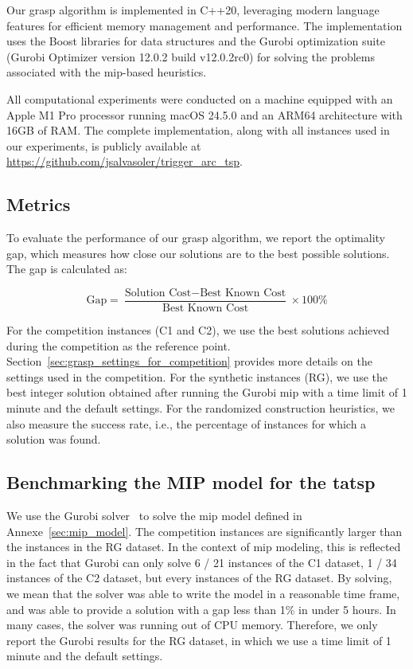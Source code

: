 \documentclass[twocolumn, switch]{article} %
\begin{document}
Our \gls{grasp} algorithm is implemented in C++20, leveraging modern language features for efficient memory management and performance.
The implementation uses the Boost libraries for data structures and the Gurobi optimization suite (Gurobi Optimizer version 12.0.2 build v12.0.2rc0) for solving the problems associated with the \gls{mip}-based heuristics.

All computational experiments were conducted on a machine equipped with an Apple M1 Pro processor running macOS 24.5.0 and an ARM64 architecture with 16GB of RAM.
The complete implementation, along with all instances used in our experiments, is publicly available at \url{https://github.com/jsalvasoler/trigger_arc_tsp}.

\subsection{Metrics}

To evaluate the performance of our \gls{grasp} algorithm, we report the optimality gap, which measures how close our solutions are to the best possible solutions. The gap is calculated as:

\begin{equation}
\text{Gap} = \frac{\text{Solution Cost} - \text{Best Known Cost}}{\text{Best Known Cost}} \times 100\%
\end{equation}

For the competition instances (C1 and C2), we use the best solutions achieved during the competition as the reference point. Section~\ref{sec:grasp_settings_for_competition} provides more details on the settings used in the competition.
For the synthetic instances (RG), we use the best integer solution obtained after running the Gurobi \gls{mip} with a time limit of 1 minute and the default settings.
For the randomized construction heuristics, we also measure the success rate, i.e., the percentage of instances for which a solution was found.

\subsection{Benchmarking the MIP model for the \gls{tatsp}}

We use the Gurobi solver~\cite{gurobi} to solve the \gls{mip} model defined in Annexe~\ref{sec:mip_model}.
The competition instances are significantly larger than the instances in the RG dataset. In the context of \gls{mip} modeling, this is reflected in the fact
that Gurobi can only solve 6 / 21 instances of the C1 dataset, 1 / 34 instances of the C2 dataset, but every instances of the RG dataset.
By solving, we mean that the solver was able to write the model in a reasonable time frame, and was able to provide a solution with a gap less than 1\% in under 5 hours.
In many cases, the solver was running out of CPU memory.
Therefore, we only report the Gurobi results for the RG dataset, in which we use a time limit of 1 minute and the default settings.
\end{document}
